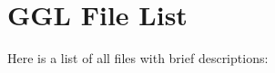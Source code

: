 \section{GGL File List}
Here is a list of all files with brief descriptions:\begin{CompactList}
\item{}
\end{CompactList}
